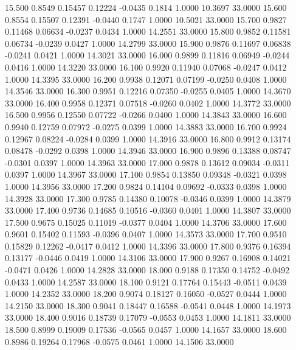   15.500   0.8549   0.15457   0.12224  -0.0435   0.1814   1.0000  10.3697  33.0000
  15.600   0.8554   0.15507   0.12391  -0.0440   0.1747   1.0000  10.5021  33.0000
  15.700   0.9827   0.11468   0.06634  -0.0237   0.0434   1.0000  14.2551  33.0000
  15.800   0.9852   0.11581   0.06734  -0.0239   0.0427   1.0000  14.2799  33.0000
  15.900   0.9876   0.11697   0.06838  -0.0241   0.0421   1.0000  14.3021  33.0000
  16.000   0.9899   0.11816   0.06949  -0.0244   0.0416   1.0000  14.3220  33.0000
  16.100   0.9920   0.11940   0.07068  -0.0247   0.0412   1.0000  14.3395  33.0000
  16.200   0.9938   0.12071   0.07199  -0.0250   0.0408   1.0000  14.3546  33.0000
  16.300   0.9951   0.12216   0.07350  -0.0255   0.0405   1.0000  14.3670  33.0000
  16.400   0.9958   0.12371   0.07518  -0.0260   0.0402   1.0000  14.3772  33.0000
  16.500   0.9956   0.12550   0.07722  -0.0266   0.0400   1.0000  14.3843  33.0000
  16.600   0.9940   0.12759   0.07972  -0.0275   0.0399   1.0000  14.3883  33.0000
  16.700   0.9924   0.12967   0.08224  -0.0284   0.0399   1.0000  14.3916  33.0000
  16.800   0.9912   0.13174   0.08478  -0.0292   0.0398   1.0000  14.3946  33.0000
  16.900   0.9896   0.13388   0.08747  -0.0301   0.0397   1.0000  14.3963  33.0000
  17.000   0.9878   0.13612   0.09034  -0.0311   0.0397   1.0000  14.3967  33.0000
  17.100   0.9854   0.13850   0.09348  -0.0321   0.0398   1.0000  14.3956  33.0000
  17.200   0.9824   0.14104   0.09692  -0.0333   0.0398   1.0000  14.3928  33.0000
  17.300   0.9785   0.14380   0.10078  -0.0346   0.0399   1.0000  14.3879  33.0000
  17.400   0.9736   0.14685   0.10516  -0.0360   0.0401   1.0000  14.3807  33.0000
  17.500   0.9675   0.15025   0.11019  -0.0377   0.0404   1.0000  14.3706  33.0000
  17.600   0.9601   0.15402   0.11593  -0.0396   0.0407   1.0000  14.3573  33.0000
  17.700   0.9510   0.15829   0.12262  -0.0417   0.0412   1.0000  14.3396  33.0000
  17.800   0.9376   0.16394   0.13177  -0.0446   0.0419   1.0000  14.3106  33.0000
  17.900   0.9267   0.16908   0.14021  -0.0471   0.0426   1.0000  14.2828  33.0000
  18.000   0.9188   0.17350   0.14752  -0.0492   0.0433   1.0000  14.2587  33.0000
  18.100   0.9121   0.17764   0.15443  -0.0511   0.0439   1.0000  14.2352  33.0000
  18.200   0.9074   0.18127   0.16050  -0.0527   0.0444   1.0000  14.2150  33.0000
  18.300   0.9041   0.18447   0.16588  -0.0541   0.0448   1.0000  14.1973  33.0000
  18.400   0.9016   0.18739   0.17079  -0.0553   0.0453   1.0000  14.1811  33.0000
  18.500   0.8999   0.19009   0.17536  -0.0565   0.0457   1.0000  14.1657  33.0000
  18.600   0.8986   0.19264   0.17968  -0.0575   0.0461   1.0000  14.1506  33.0000
